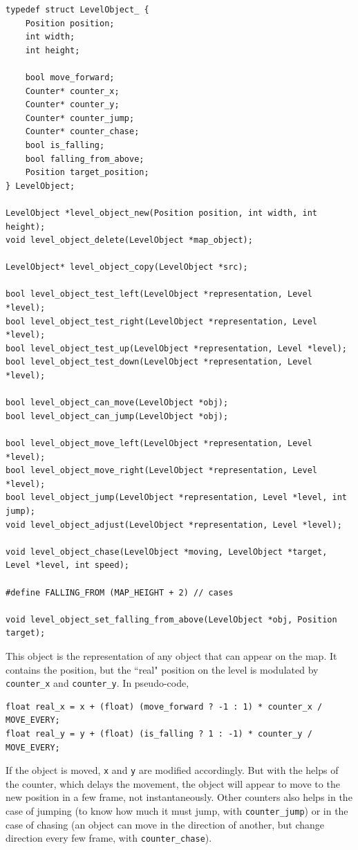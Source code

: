 \documentclass[12pt,a4paper]{article}
\newcommand{\cc}[1]{\texttt{#1}}
\begin{document}
\begin{verbatim}
typedef struct LevelObject_ {
    Position position;
    int width;
    int height;

    bool move_forward;
    Counter* counter_x;
    Counter* counter_y;
    Counter* counter_jump;
    Counter* counter_chase;    
    bool is_falling;
    bool falling_from_above;
    Position target_position;
} LevelObject;

LevelObject *level_object_new(Position position, int width, int height);
void level_object_delete(LevelObject *map_object);

LevelObject* level_object_copy(LevelObject *src);

bool level_object_test_left(LevelObject *representation, Level *level);
bool level_object_test_right(LevelObject *representation, Level *level);
bool level_object_test_up(LevelObject *representation, Level *level);
bool level_object_test_down(LevelObject *representation, Level *level);

bool level_object_can_move(LevelObject *obj);
bool level_object_can_jump(LevelObject *obj);

bool level_object_move_left(LevelObject *representation, Level *level);
bool level_object_move_right(LevelObject *representation, Level *level);
bool level_object_jump(LevelObject *representation, Level *level, int jump);
void level_object_adjust(LevelObject *representation, Level *level);

void level_object_chase(LevelObject *moving, LevelObject *target, Level *level, int speed);

#define FALLING_FROM (MAP_HEIGHT + 2) // cases

void level_object_set_falling_from_above(LevelObject *obj, Position target);
\end{verbatim}

This object is the representation of any object that can appear on the map. It contains the position, but the ``real" position on the level is modulated by \cc{counter_x} and \cc{counter_y}. In pseudo-code,\begin{verbatim}
float real_x = x + (float) (move_forward ? -1 : 1) * counter_x / MOVE_EVERY;
float real_y = y + (float) (is_falling ? 1 : -1) * counter_y / MOVE_EVERY;
\end{verbatim}

If the object is moved, \cc{x} and \cc{y} are modified accordingly. But with the helps of the counter, which delays the movement, the object will appear to move to the new position in a few frame, not instantaneously. Other counters also helps in the case of jumping (to know how much it must jump, with \cc{counter_jump}) or in the case of chasing (an object can move in the direction of another, but change direction every few frame, with \cc{counter_chase}).
\end{document}
